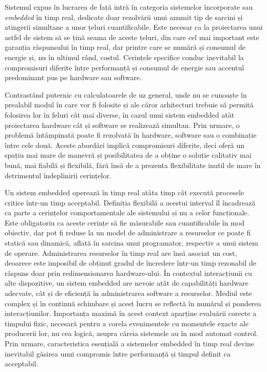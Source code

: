 Sistemul expus în lucrarea de față intră în categoria sistemelor încorporate sau \textit{embedded} în timp real, dedicate doar rezolvării unui anumit tip de sarcini și atingerii simultane a unor țeluri cuantificabile. Este necesar ca la proiectarea unui astfel de sistem să se țină seama de aceste țeluri, din care cel mai important este garanția răspunsului în timp real, dar printre care se numără și consumul de energie și, nu în ultimul rând, costul. Cerințele specifice conduc inevitabil la compromisuri diferite între performanță și consumul de energie sau accentul predominant pus pe hardware sau software.

Contrastând puternic cu calculatoarele de uz general, unde nu se cunoaște în prealabil modul în care vor fi folosite și ale căror arhitecturi trebuie să permită folosirea lor în feluri cât mai diverse, în cazul unui sistem embedded atât proiectarea hardware cât și software se realizează simultan. Prin urmare, o problemă întâmpinată poate fi rezolvată în hardware, software sau o combinație între cele două. Aceste abordări implică compromisuri diferite, deci oferă un spațiu mai mare de manevră și posibilitatea de a obține o soluție calitativ mai bună, mai fiabilă și flexibilă, fără însă de a prezenta flexibilitate inutil de mare în detrimentul îndeplinirii cerințelor. \cite{wolf}

Un sistem embedded operează în timp real atâta timp cât execută procesele critice într-un timp acceptabil. Definiția flexibilă a acestui interval îl încadrează ca parte a cerințelor comportamentale ale sistemului și nu a celor funcționale. Este obligatoriu ca aceste cerințe să fie măsurabile sau cuantificabile în mod obiectiv, dar pot fi reduse la un model de administrare a resurselor ce poate fi statică sau dinamică, aflată în sarcina unui programator, respectiv a unui sistem de operare. Administrarea resurselor în timp real are însă asociat un cost, deoarece este imposibil de obținut gradul de încredere într-un timp rezonabil de răspuns doar prin redimensionarea hardware-ului. În contextul interacțiunii cu alte dispozitive, un sistem embedded are nevoie atât de capabilități hardware adecvate, cât și de eficiență în administrarea software a resurselor. Mediul este complex și în continuă schimbare și acest lucru se reflectă în numărul și ponderea interacțiunilor. Importanța maximă în acest context aparține evaluării corecte a timpului fizic, necesară pentru a corela evenimentele cu momentele exacte ale producerii lor, nu cea logică, asupra căreia sistemele au în mod automat control. Prin urmare, caracteristica esențială a sistemelor embedded în timp real devine inevitabil găsirea unui compromis între performanță și timpul definit ca acceptabil. \cite{kraeling}

